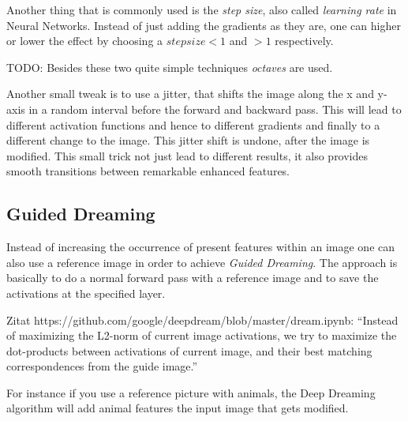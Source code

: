 Another thing that is commonly used is the \emph{step size}, also called \emph{learning rate} in Neural Networks.
Instead of just adding the gradients as they are, one can higher or lower the effect by choosing a $step size < 1$ and $> 1$ respectively.

TODO: Besides these two quite simple techniques \emph{octaves} are used. 

Another small tweak is to use a jitter, that shifts the image along the x and y-axis in a random interval before the forward and backward pass.
This will lead to different activation functions and hence to different gradients and finally to a different change to the image.
This jitter shift is undone, after the image is modified.
This small trick not just lead to different results, it also provides smooth transitions between remarkable enhanced features.



\subsection{Guided Dreaming}
\label{guided-dreaming}
Instead of increasing the occurrence of present features within an image one can also use a reference image in order to achieve \emph{Guided Dreaming}.
The approach is basically to do a normal forward pass with a reference image and to save the activations at the specified layer.

Zitat https://github.com/google/deepdream/blob/master/dream.ipynb: \enquote{Instead of maximizing the L2-norm of current image activations, we try to maximize the dot-products between activations of current image, and their best matching correspondences from the guide image.}



For instance if you use a reference picture with animals, the Deep Dreaming algorithm will add animal features the input image that gets modified.

